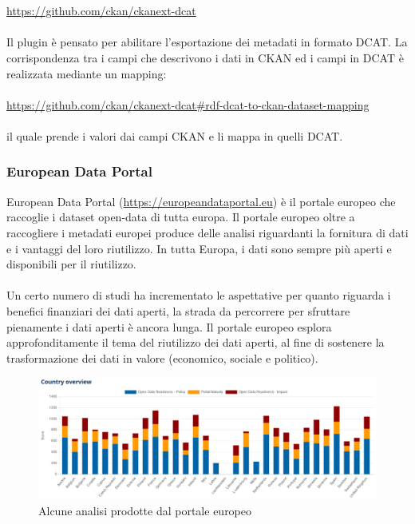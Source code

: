 \documentclass{article}
\theoremstyle{plain}
\theoremstyle{definition}
\begin{document}
\\
\\
\url{https://github.com/ckan/ckanext-dcat} 
\\
\\
Il plugin è pensato per abilitare l'esportazione dei metadati in formato DCAT. La corrispondenza tra i campi che descrivono i dati in CKAN ed i campi in DCAT è realizzata mediante un mapping:
\\
\\
\url{https://github.com/ckan/ckanext-dcat#rdf-dcat-to-ckan-dataset-mapping}
\\
\\
il quale prende i valori dai campi CKAN e li mappa in quelli DCAT.

\subsubsection{European Data Portal}
European Data Portal (\url{https://europeandataportal.eu}) è il portale europeo che raccoglie i dataset open-data di tutta europa.
Il portale europeo oltre a raccogliere i metadati europei produce delle analisi riguardanti la fornitura di dati e i vantaggi del loro riutilizzo. In tutta Europa, i dati sono sempre più aperti e disponibili per il riutilizzo. 
\\
\\
Un certo numero di studi ha incrementato le aspettative per quanto riguarda i benefici finanziari dei dati aperti, la strada da percorrere per sfruttare pienamente i dati aperti è ancora lunga. Il portale europeo esplora approfonditamente il tema del riutilizzo dei dati aperti, al fine di sostenere la trasformazione dei dati in valore (economico, sociale e politico).
\begin{figure}[htbp]
\begin{center}
\includegraphics[scale=0.50]{img/eustat.png}
\caption{Alcune analisi prodotte dal portale europeo}
\end{center}
\end{figure}
\end{document}
